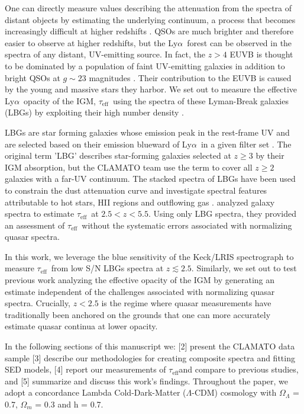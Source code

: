 \documentclass[twocolumn,tight,times]{aastex63}
\newcommand{\mteff}{\tau_\mathrm{eff}}
\newcommand{\teff}{$\mteff$}
\newcommand{\lya}{Ly$\alpha$}
\begin{document}
One can directly measure values describing the attenuation from the spectra of distant objects by estimating the underlying continuum, a process that becomes increasingly difficult at higher redshifts \citep[e..g][]{Kirkman_2005}. QSOs are much brighter and therefore easier to observe at higher redshifts, but the \lya\ forest can be observed in the spectra of any distant, UV-emitting source. In fact, the $z>4$ EUVB is thought to be dominated by a population of faint UV-emitting galaxies in addition to bright QSOs at $g \sim 23$ magnitudes \citep{Lee_2014}. Their contribution to the EUVB is caused by the young and massive stars they harbor. We set out to measure the effective \lya\ opacity of the IGM, \teff\, using the spectra of these Lyman-Break galaxies (LBGs) by exploiting their high number density \cite[hereafter L18]{Lee_2018}.

LBGs are star forming galaxies whose emission peak in the rest-frame UV and are selected based on their emission blueward of \lya\ in a given filter set \citep{Steidel_1996}. The original term 'LBG' describes star-forming galaxies selected at $z \geq 3$ by their IGM absorption, but the CLAMATO team use the term to cover all $z \geq 2$ galaxies with a far-UV continuum. The stacked spectra of LBGs have been used to constrain the dust attenuation curve \citep{Reddy_2016} and investigate spectral features attributable to hot stars, HII regions and outflowing gas \citep{Shapley_2003}. \cite{Thomas_2017} analyzed galaxy spectra to estimate \teff\ at $2.5 < z < 5.5$.  Using only LBG spectra, they provided an assessment of \teff\ without the systematic errors associated with normalizing quasar spectra.

In this work, we leverage the blue sensitivity of the Keck/LRIS spectrograph to measure \teff\ from low S/N LBGs spectra  at $z \lesssim 2.5$.  Similarly, we set out to test previous work analyzing the effective opacity of the IGM by generating an estimate independent of the challenges associated with normalizing quasar spectra. Crucially, $z < 2.5$ is the regime where quasar measurements have traditionally been anchored on the grounds that one can more accurately estimate quasar continua at lower opacity.

In the following sections of this manuscript we: [2] present the CLAMATO data sample [3] describe our methodologies for creating composite spectra and fitting SED models, [4] report our measurements of \teff and compare to previous studies, and [5] summarize and discuss this work’s findings. Throughout the paper, we adopt a concordance Lambda Cold-Dark-Matter ($\Lambda$-CDM) cosmology with $\Omega_{\Lambda}$ = 0.7, $\Omega_{m}$ = 0.3 and h = 0.7.
\end{document}
